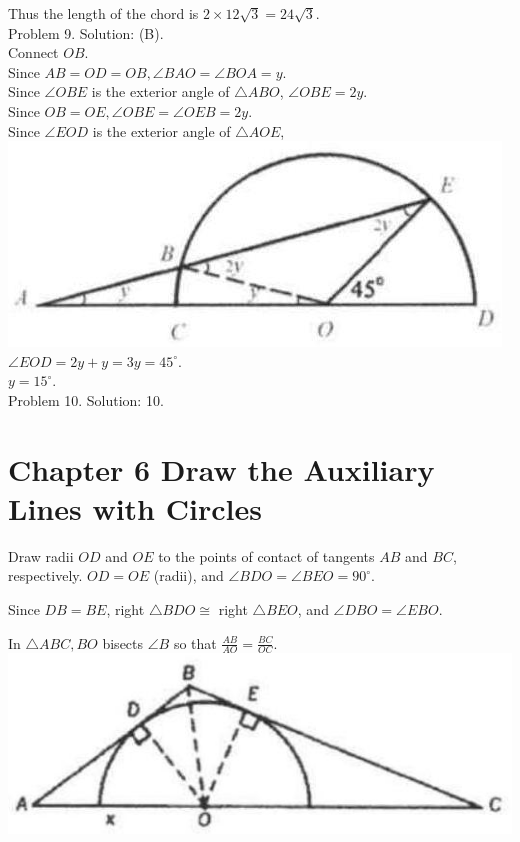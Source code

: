 \documentclass[10pt]{article}
\begin{document}
Thus the length of the chord is \(2 \times 12 \sqrt{3}=24 \sqrt{3}\).\\
Problem 9. Solution: (B).\\
Connect \(O B\).\\
Since \(A B=O D=O B, \angle B A O=\angle B O A=y\).\\
Since \(\angle O B E\) is the exterior angle of \(\triangle A B O\), \(\angle O B E=2 y\).\\
Since \(O B=O E, \angle O B E=\angle O E B=2 y\).\\
Since \(\angle E O D\) is the exterior angle of \(\triangle A O E\),\\
\includegraphics[max width=\textwidth, center]{2025_04_17_97bc1f7e44d93c271a88g-159(2)}\\
\(\angle E O D=2 y+y=3 y=45^{\circ}\).\\
\(y=15^{\circ}\).\\
Problem 10. Solution: 10.

\section*{Chapter 6 Draw the Auxiliary Lines with Circles}
Draw radii \(O D\) and \(O E\) to the points of contact of tangents \(A B\) and \(B C\), respectively. \(O D=O E\) (radii), and \(\angle B D O=\angle B E O=90^{\circ}\).

Since \(D B=B E\), right \(\triangle B D O \cong\) right \(\triangle B E O\), and \(\angle D B O=\angle E B O\).

In \(\triangle A B C, B O\) bisects \(\angle B\) so that \(\frac{A B}{A O}=\frac{B C}{O C}\).\\
\includegraphics[max width=\textwidth, center]{2025_04_17_97bc1f7e44d93c271a88g-160}
\end{document}
